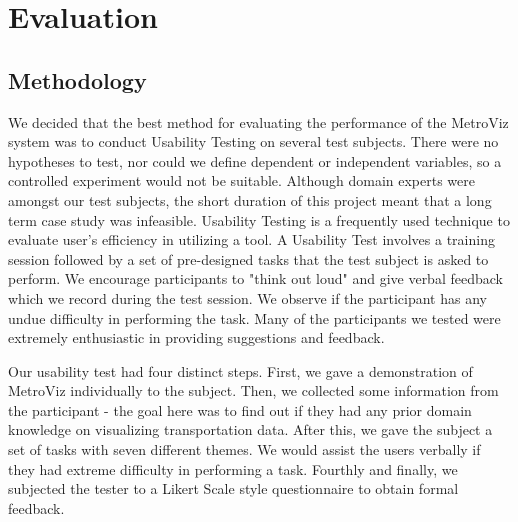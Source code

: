 \documentclass[journal]{vgtc}                %
\begin{document}
\section{Evaluation}
\subsection{Methodology}
We decided that the best method for evaluating the performance of the MetroViz system was to conduct Usability Testing on several test subjects. There were no hypotheses to test, nor could we define dependent or independent variables, so a controlled experiment would not be suitable. Although domain experts were amongst our test subjects, the short duration of this project meant that a long term case study was infeasible. Usability Testing is a frequently used technique to evaluate user's efficiency in utilizing a tool. A Usability Test involves a training session followed by a set of pre-designed tasks that the test subject is asked to perform. We encourage participants to "think out loud" and give verbal feedback which we record during the test session. We observe if the participant has any undue difficulty in performing the task. Many of the participants we tested were extremely enthusiastic in providing suggestions and feedback. 

Our usability test had four distinct steps. First, we gave a demonstration of MetroViz individually to the subject. Then, we collected some information from the participant - the goal here was to find out if they had any prior domain knowledge on visualizing transportation data. After this, we gave the subject a set of tasks with seven different themes. We would assist the users verbally if they had extreme difficulty in performing a task. Fourthly and finally, we subjected the tester to a Likert Scale style questionnaire to obtain formal feedback. 
\end{document}

